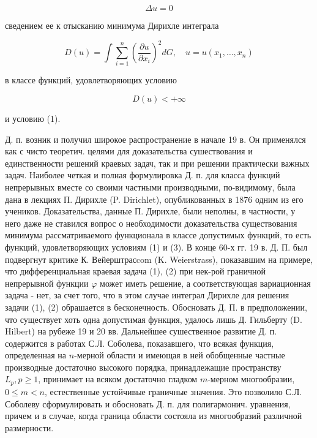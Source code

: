 \documentclass[10pt]{article}
\begin{document}
\[

\Delta u=0

\]



сведением ее к отысканию минимума Дирихле интеграла



\[

D(u)=\int \sum_{i=1}^{n}\left(\frac{\partial u}{\partial x_{i}}\right)^{2} d G, \quad u=u\left(x_{1}, \ldots, x_{n}\right)

\]



в классе функций, удовлетворяющих условию



\[

D(u)<+\infty

\]



и условию (1).



Д. п. возник и получил широкое распространение в начале 19 в. Он применялся как с чисто теоретич. целями для доказательства сушествования и единственности решений краевых задач, так и при решении практически важных задач. Наиболее четкая и полная формулировка Д. п. для класса функций непрерывных вместе со своими частными производными, по-видимому, была дана в лекциях П. Дирихле (P. Dirichlet), опубликованных в 1876 одним из его учеников. Доказательства, данные П. Дирихле, были неполны, в частности, у него даже не ставился вопрос о необходимости доказательства существования минимума рассматриваемого функционала в классе допустимых функций, то есть функций, удовлетворяющих условиям (1) и (3). В конце 60-х гг. 19 в. Д. П. был подвергнут критике К. Вейерштрасcom (K. Weierstrass), показавшим на примере, что дифференциальная краевая задача (1), (2) при нек-рой граничной непрерывной функции $\varphi$ может иметь решение, а соответствующая вариационная задача - нет, за счет того, что в этом случае интеграл Дирихле для решения задачи (1), (2) обрашается в бесконечность. Обосновать Д. П. в предположении, что существует хоть одна допустимая функция, удалось лишь Д. Гильберту (D. Hilbert) на рубеже 19 и 20 вв. Дальнейшее сушественное развитие Д. п. содержится в работах С.Л. Соболева, показавшего, что всякая функция, определенная на $n$-мерной области и имеющая в ней обобщенные частные производные достаточно высокого порядка, принадлежащие пространству $L_{p}, p \geqslant 1$, принимает на всяком достаточно гладком $m$-мерном многообразии, $0 \leqslant m<n$, естественные устойчивые граничные значения. Это позволило С.Л. Соболеву сформулировать и обосновать Д. п. для полигармонич. уравнения, причем и в случае, когда граница области состояла из многообразий различной размерности.
\end{document}

